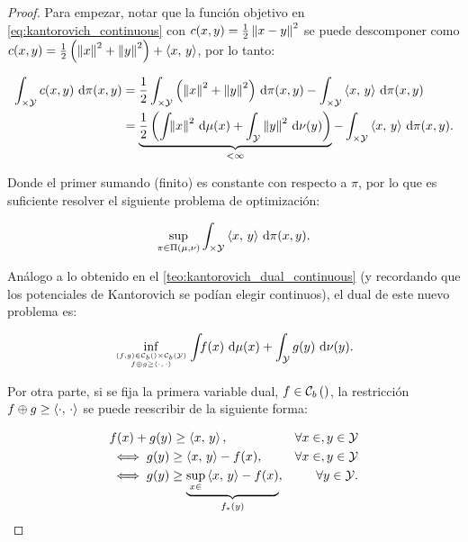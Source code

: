 \begin{proof}
	Para empezar, notar que la función objetivo en \eqref{eq:kantorovich_continuous} con $c(x,y)=\frac{1}{2}\left\lVert x-y \right\rVert^2$ se puede descomponer como $c(x,y)=\frac{1}{2}\left(\left\lVert x \right\rVert^2+\left\lVert y \right\rVert^2\right)+\left\langle x,\,y\right\rangle$, por lo tanto:

	\begin{align*}
		\int_{\times\mathcal{Y}} c(x,y) \,\operatorname{d}\!\pi(x,y) & = \frac{1}{2}\int_{\times\mathcal{Y}} \left(\left\lVert x \right\rVert^2 + \left\lVert y \right\rVert^2\right) \,\operatorname{d}\!\pi(x,y) - \int_{\times\mathcal{Y}} \left\langle x,\,y\right\rangle \,\operatorname{d}\!\pi(x,y)                                 \\
		                                        & = \underbrace{\frac{1}{2}\left(\int_{} \left\lVert x \right\rVert^2 \,\operatorname{d}\!\mu(x) + \int_{\mathcal{Y}} \left\lVert y \right\rVert^2 \,\operatorname{d}\!\nu(y)\right)}_{<\infty} - \int_{\times\mathcal{Y}} \left\langle x,\,y\right\rangle \,\operatorname{d}\!\pi(x,y).
	\end{align*}

	Donde el primer sumando (finito) es constante con respecto a $\pi$, por lo que es suficiente resolver el siguiente problema de optimización:

	\begin{equation*}
		\sup_{\pi\in\Pi(\mu,\nu)} \int_{\times\mathcal{Y}} \left\langle x,\,y\right\rangle \,\operatorname{d}\!\pi(x,y).
	\end{equation*}

	Análogo a lo obtenido en el \autoref{teo:kantorovich_dual_continuous} (y recordando que los potenciales de Kantorovich se podían elegir continuos), el dual de este nuevo problema es:

	\begin{equation}
		\label{eq:brenier_dual}
		\inf_{\feasible{(f,g)\in \continuousb{\xspace}\times\continuousb{\yspace}}{f\oplus g \geq \dotproduct{\cdot}{\cdot}}}
		\int_{\xspace} f(x) \d\mu(x) + \int_{\yspace} g(y) \d\nu(y).
	\end{equation}

	Por otra parte, si se fija la primera variable dual, $f\in \mathcal{C}_b\left(\right)$, la restricción $f\oplus g \geq \left\langle \cdot,\,\cdot\right\rangle$ se puede reescribir de la siguiente forma:

	\begin{alignat*}{3}
		& f(x)+g(y) \geq \left\langle x,\,y\right\rangle, &\forall x\in,y\in\mathcal{Y}                                           \\
		 & \iff g(y) \geq \left\langle x,\,y\right\rangle - f(x), &\forall x\in,y\in\mathcal{Y}                                  \\
		 & \iff g(y) \geq \underbrace{\sup_{x\in} \left\langle x,\,y\right\rangle - f(x)}_{f_*(y)}, &\forall y\in\mathcal{Y} .
	\end{alignat*}


\end{proof}
